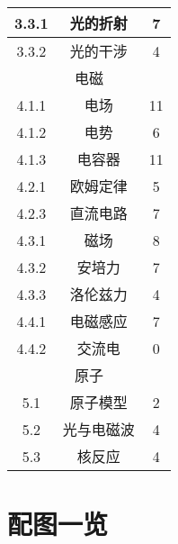 \begin{center}
\begin{minipage}{0.48\textwidth}
\begin{tabular}{c|c|c}
            3.3.1&光的折射&7\\\hline
            3.3.2&光的干涉&4\\\hline
            \multicolumn{3}{c}{电磁}\\\hline
            4.1.1&电场&11\\\hline
            4.1.2&电势&6\\\hline
            4.1.3&电容器&11\\\hline
            4.2.1&欧姆定律&5\\\hline
            4.2.3&直流电路&7\\\hline
            4.3.1&磁场&8\\\hline
            4.3.2&安培力&7\\\hline
            4.3.3&洛伦兹力&4\\\hline
            4.4.1&电磁感应&7\\\hline
            4.4.2&交流电&0\\\hline
            \multicolumn{3}{c}{原子}\\\hline
            5.1&原子模型&2\\\hline
            5.2&光与电磁波&4\\\hline
            5.3&核反应&4\\\hline
        \end{tabular}
    \end{minipage}
\end{center}

\chapter{配图一览}

\makeatletter
\begin{multicols}{2}
\end{multicols}
\makeatother
